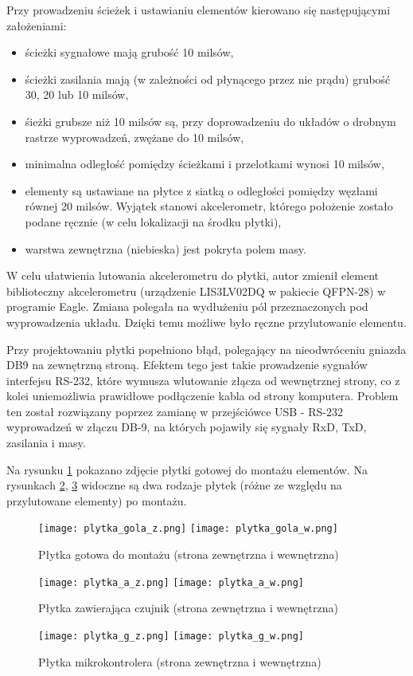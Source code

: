 Przy prowadzeniu ścieżek i ustawianiu elementów kierowano się następującymi założeniami:
\begin{itemize}
\item ścieżki sygnałowe mają grubość 10 milsów,
\item ścieżki zasilania mają (w zależności od płynącego przez nie prądu) grubość 30, 20 lub 10 milsów,
\item śieżki grubsze niż 10 milsów są, przy doprowadzeniu do układów o drobnym rastrze wyprowadzeń, zwężane do 10 milsów,
\item minimalna odległość pomiędzy ścieżkami i przelotkami wynosi 10 milsów,
\item elementy są ustawiane na płytce z siatką o odległości pomiędzy węzłami równej 20 milsów. Wyjątek stanowi akcelerometr, którego położenie zostało podane ręcznie (w celu lokalizacji na środku płytki),
\item warstwa zewnętrzna (niebieska) jest pokryta polem masy.
\end{itemize}
W celu ułatwienia lutowania akcelerometru do płytki, autor zmienił element biblioteczny akcelerometru (urządzenie LIS3LV02DQ w pakiecie QFPN-28) w programie Eagle. Zmiana polegała na wydłużeniu pól przeznaczonych pod wyprowadzenia układu. Dzięki temu możliwe było ręczne przylutowanie elementu.

Przy projektowaniu płytki popełniono błąd, polegający na nieodwróceniu gniazda DB9 na zewnętrzną stroną. Efektem tego jest takie prowadzenie sygnałów interfejsu RS-232, które wymusza wlutowanie złącza od wewnętrznej strony, co z kolei uniemożliwia prawidłowe podłączenie kabla od strony komputera. Problem ten został rozwiązany poprzez zamianę w przejściówce USB - RS-232 wyprowadzeń w złączu DB-9, na których pojawiły się sygnały RxD, TxD, zasilania i masy.

Na rysunku \ref{plytka_gola} pokazano zdjęcie płytki gotowej do montażu elementów. Na rysunkach \ref{plytka_a}, \ref{plytka_g} widoczne są dwa rodzaje płytek (różne ze względu na przylutowane elementy) po montażu.
\vspace{3cm}
 \begin{figure}[ht]
  \centering
\texttt{[image: plytka\_gola\_z.png]}
\texttt{[image: plytka\_gola\_w.png]}
 \caption{Płytka gotowa do montażu (strona zewnętrzna i wewnętrzna)}
\label{plytka_gola}
\end{figure}
 \begin{figure}[ht]
  \centering
\texttt{[image: plytka\_a\_z.png]}
\texttt{[image: plytka\_a\_w.png]}
 \caption{Płytka zawierająca czujnik (strona zewnętrzna i wewnętrzna)}
\label{plytka_a}
\end{figure}
 \begin{figure}[ht]
  \centering
\texttt{[image: plytka\_g\_z.png]}
\texttt{[image: plytka\_g\_w.png]}
 \caption{Płytka mikrokontrolera (strona zewnętrzna i wewnętrzna)}
\label{plytka_g}
\end{figure}
\newpage
